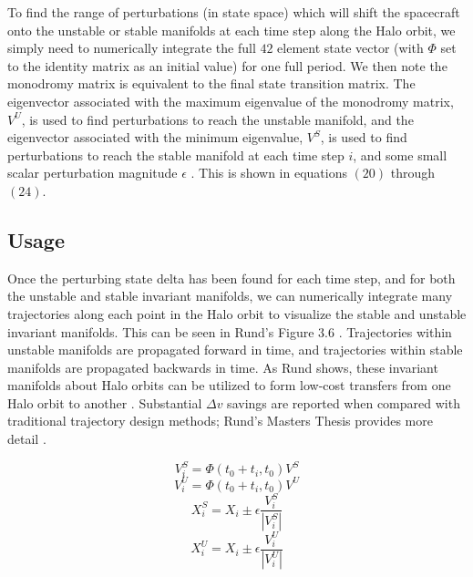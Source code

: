 \documentclass[conf]{new-aiaa}
\begin{document}
\begin{multicols}{2}
To find the range of perturbations (in state space) which will shift the spacecraft 
onto the unstable or stable manifolds at each time step along the Halo orbit, 
we simply need to numerically integrate the full $42$ element state vector (with $\Phi$ set
to the identity matrix as an initial value) for one full period. We then note the 
monodromy matrix is equivalent to the final state transition matrix. The eigenvector 
associated with the maximum eigenvalue of the monodromy matrix, $V^U$, is used to find perturbations 
to reach the unstable manifold, and the eigenvector associated with the minimum eigenvalue, $V^S$,
is used to find perturbations to reach the stable manifold 
at each time step $i$, and some small scalar perturbation magnitude 
$\epsilon$ \cite{rund2018interplanetary}. This is shown in equations $(20)$ through $(24)$.

\subsection{Usage}

Once the perturbing state delta has been found for each time step, and for both the 
unstable and stable invariant manifolds, we can numerically integrate many trajectories 
along each point in the Halo orbit to visualize the stable and unstable invariant manifolds. 
This can be seen in Rund's Figure 3.6 \cite{rund2018interplanetary}. Trajectories within
unstable manifolds are propagated forward in time, and trajectories within stable manifolds are 
propagated backwards in time. As Rund shows, these invariant manifolds about Halo 
orbits can be utilized to form low-cost transfers from one Halo orbit to another 
\cite{rund2018interplanetary}. Substantial $\Delta v$ savings are reported when 
compared with traditional trajectory design methods; Rund's Masters Thesis provides 
more detail \cite{rund2018interplanetary}.

\begin{equation}
    V_i^{S} = \Phi(t_0 + t_i, t_0) V^S
\end{equation}
\begin{equation}
    V_i^{U} = \Phi(t_0 + t_i, t_0) V^U
\end{equation}
\begin{equation}
    X_i^{S} = X_i \pm \epsilon \frac{V_i^S}{|V_i^S|}
\end{equation}
\begin{equation}
    X_i^{U} = X_i \pm \epsilon \frac{V_i^U}{|V_i^U|}
\end{equation}


\end{multicols}
\end{document}
